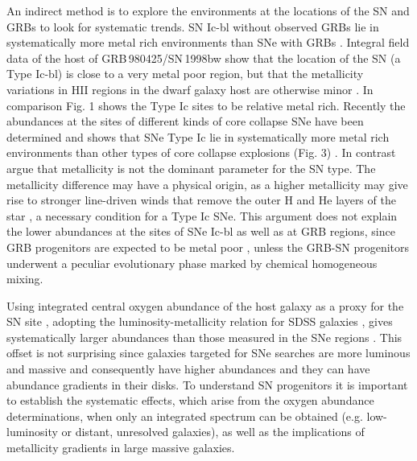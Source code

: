 \hspace{0.4cm} An indirect method is to explore the environments at
the locations of the SN and GRBs to look for systematic trends. SN
Ic-bl without observed GRBs lie in systematically more metal rich
environments than SNe with GRBs \citep{Modjaz2008}. Integral field data of the host
of GRB\,980425/SN\,1998bw show that the location of the SN (a Type
Ic-bl) is close to a very metal poor region, but that the metallicity
variations in HII regions in the dwarf galaxy host are otherwise minor
\citep{Christensen2008}.  In comparison Fig. 1 shows the Type Ic sites to be relative
metal rich. Recently the abundances at the sites of different kinds of
core collapse SNe have been determined and shows that SNe Type Ic lie
in systematically more metal rich environments than other types of
core collapse explosions (Fig. 3) \citep{Modjaz2011, Leloudas2011, Kuncarayakti2013a, Kelly2012}.  In contrast \citet{Anderson2010} argue
that metallicity is not the dominant parameter for the SN type. The
metallicity difference may have a physical origin, as a higher
metallicity may give rise to stronger line-driven winds that remove
the outer H and He layers of the star \cite{Vink2005}, a necessary condition for
a Type Ic SNe. This argument does not explain the lower abundances at
the sites of SNe Ic-bl as well as at GRB regions, since GRB
progenitors are expected to be metal poor \citep{Woosley1993}, unless the GRB-SN
progenitors underwent a peculiar evolutionary phase marked by chemical
homogeneous mixing. %

\hspace{0.4cm}
Using integrated central oxygen abundance of the host
galaxy as a proxy for the SN site \citep{Prieto2008, Kelly2012}, adopting the
luminosity-metallicity relation for SDSS galaxies \citep{Tremonti2004}, gives
systematically larger abundances than those measured in the SNe regions \citep{Modjaz2011}.
This offset is not surprising since galaxies targeted for SNe searches
are more luminous and massive and consequently have higher abundances
and they can have abundance gradients in their disks.
To understand SN progenitors it is important to establish the
systematic effects, which arise from the oxygen abundance
determinations, when only an integrated spectrum can be obtained
(e.g. low-luminosity or distant, unresolved galaxies), as well as the
implications of metallicity gradients in large massive galaxies.









